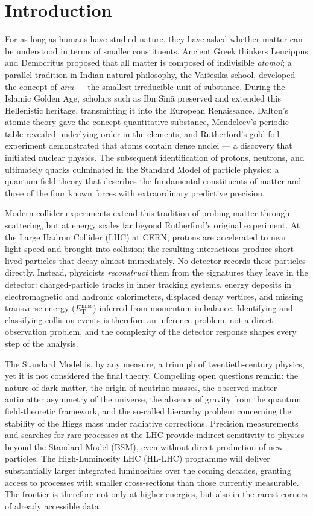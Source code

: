 \chapter{Introduction}
\label{chapter:Introduction}

For as long as humans have studied nature, they have asked whether matter can be understood in terms of smaller constituents.
Ancient Greek thinkers Leucippus and Democritus proposed that all matter is composed of indivisible \textit{atomoi}; a parallel tradition in Indian natural philosophy, the Vai\'{s}e\d{s}ika school, developed the concept of \textit{a\d{n}u} --- the smallest irreducible unit of substance.
During the Islamic Golden Age, scholars such as Ibn S\={\i}n\={a} preserved and extended this Hellenistic heritage, transmitting it into the European Renaissance.
Dalton's atomic theory gave the concept quantitative substance, Mendeleev's periodic table revealed underlying order in the elements, and Rutherford's gold-foil experiment demonstrated that atoms contain dense nuclei --- a discovery that initiated nuclear physics.
The subsequent identification of protons, neutrons, and ultimately quarks culminated in the Standard Model of particle physics: a quantum field theory that describes the fundamental constituents of matter and three of the four known forces with extraordinary predictive precision.

Modern collider experiments extend this tradition of probing matter through scattering, but at energy scales far beyond Rutherford's original experiment.
At the Large Hadron Collider (LHC) at CERN, protons are accelerated to near light-speed and brought into collision; the resulting interactions produce short-lived particles that decay almost immediately.
No detector records these particles directly.
Instead, physicists \textit{reconstruct} them from the signatures they leave in the detector: charged-particle tracks in inner tracking systems, energy deposits in electromagnetic and hadronic calorimeters, displaced decay vertices, and missing transverse energy ($E_{\mathrm{T}}^{\mathrm{miss}}$) inferred from momentum imbalance.
Identifying and classifying collision events is therefore an inference problem, not a direct-observation problem, and the complexity of the detector response shapes every step of the analysis.

The Standard Model is, by any measure, a triumph of twentieth-century physics, yet it is not considered the final theory.
Compelling open questions remain: the nature of dark matter, the origin of neutrino masses, the observed matter--antimatter asymmetry of the universe, the absence of gravity from the quantum field-theoretic framework, and the so-called hierarchy problem concerning the stability of the Higgs mass under radiative corrections.
Precision measurements and searches for rare processes at the LHC provide indirect sensitivity to physics beyond the Standard Model (BSM), even without direct production of new particles.
The High-Luminosity LHC (HL-LHC) programme will deliver substantially larger integrated luminosities over the coming decades, granting access to processes with smaller cross-sections than those currently measurable.
The frontier is therefore not only at higher energies, but also in the rarest corners of already accessible data.

